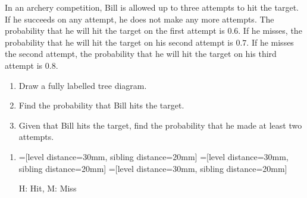 \documentclass[11pt,a4paper]{book}
\begin{document}
\begin{example}

In an archery competition, Bill is allowed up to three attempts to
hit the target. If he succeeds on any attempt, he does not make any
more attempts. The probability that he will hit the target on the
first attempt is $0.6$. If he misses, the probability that he will
hit the target on his second attempt is $0.7$. If he misses the second
attempt, the probability that he will hit the target on his third
attempt is $0.8$.

\begin{enumerate}[label=(\alph*)]

\item Draw a fully labelled tree diagram.

\item Find the probability that Bill hits the target.

\item Given that Bill hits the target, find the probability that
he made at least two attempts.

\end{enumerate}

\Solution

\begin{enumerate}[label=(\alph*)]

\item \leavevmode\vadjust{\vspace{-\baselineskip}}\newline {}=[level distance=30mm, sibling distance=20mm]
=[level distance=30mm, sibling distance=20mm]
=[level distance=30mm, sibling distance=20mm]

H: Hit, M: Miss


\end{enumerate}
\end{example}
\end{document}
